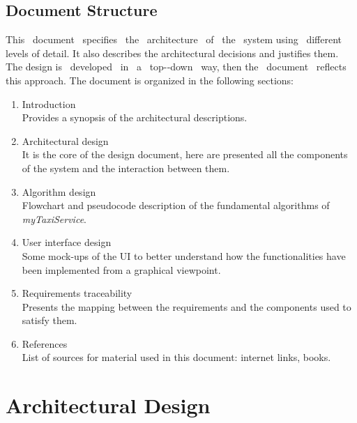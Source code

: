 \documentclass[a4paper,11pt]{report} %
\newcommand{\mts}{\mbox{\normalfont\itshape myTaxiService}}
\begin{document}
	\subsection{Document Structure} This  document  specifies  the  architecture  of  the  system  using  different levels of detail. It also describes the architectural decisions and justifies them. The design is  developed  in  a  top-­‐down  way, then the  document  reflects this approach.
	The document is organized in the following sections:
	\begin{enumerate}
		\item Introduction\\
		Provides a synopsis of the architectural descriptions.
		\item Architectural design\\
		It is the core of the design document, here are presented all the components of the system and the interaction between them.		
		\item Algorithm design\\
		Flowchart and pseudocode description of the fundamental algorithms of \mts{}. 
		\item User interface design\\
		Some mock-ups of the UI to better understand how the functionalities have been implemented from a graphical viewpoint.
		\item Requirements traceability\\
		Presents the mapping between the requirements and the components used to satisfy them.
		\item References\\
		List of sources for material used in this document: internet links, books.
		
	\end{enumerate} 
	
	\section{Architectural Design}
	
\end{document}
